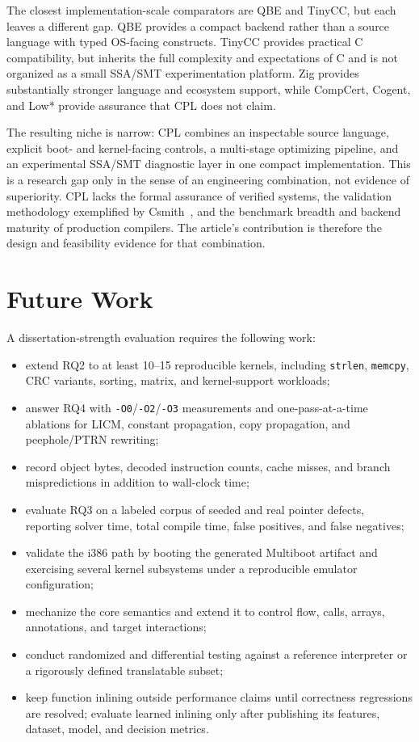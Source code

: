 \documentclass[10pt,twocolumn]{article}
\begin{document}
\par The closest implementation-scale comparators are QBE and TinyCC, but each leaves a different gap. QBE provides a compact backend rather than a source language with typed OS-facing constructs. TinyCC provides practical C compatibility, but inherits the full complexity and expectations of C and is not organized as a small SSA/SMT experimentation platform. Zig provides substantially stronger language and ecosystem support, while CompCert, Cogent, and Low* provide assurance that CPL does not claim.

\par The resulting niche is narrow: CPL combines an inspectable source language, explicit boot- and kernel-facing controls, a multi-stage optimizing pipeline, and an experimental SSA/SMT diagnostic layer in one compact implementation. This is a research gap only in the sense of an engineering combination, not evidence of superiority. CPL lacks the formal assurance of verified systems, the validation methodology exemplified by Csmith~\cite{yang2011csmith}, and the benchmark breadth and backend maturity of production compilers. The article's contribution is therefore the design and feasibility evidence for that combination.

\section{Future Work}

\par A dissertation-strength evaluation requires the following work:
\begin{itemize}[leftmargin=*]
  \item extend RQ2 to at least 10--15 reproducible kernels, including \texttt{strlen}, \texttt{memcpy}, CRC variants, sorting, matrix, and kernel-support workloads;
  \item answer RQ4 with \texttt{-O0}/\texttt{-O2}/\texttt{-O3} measurements and one-pass-at-a-time ablations for LICM, constant propagation, copy propagation, and peephole/PTRN rewriting;
  \item record object bytes, decoded instruction counts, cache misses, and branch mispredictions in addition to wall-clock time;
  \item evaluate RQ3 on a labeled corpus of seeded and real pointer defects, reporting solver time, total compile time, false positives, and false negatives;
  \item validate the i386 path by booting the generated Multiboot artifact and exercising several kernel subsystems under a reproducible emulator configuration;
  \item mechanize the core semantics and extend it to control flow, calls, arrays, annotations, and target interactions;
  \item conduct randomized and differential testing against a reference interpreter or a rigorously defined translatable subset;
  \item keep function inlining outside performance claims until correctness regressions are resolved; evaluate learned inlining only after publishing its features, dataset, model, and decision metrics.
\end{itemize}
\end{document}
